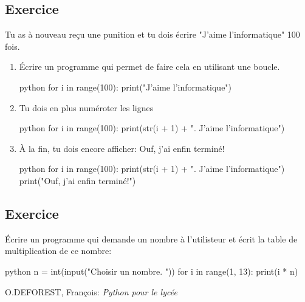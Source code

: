 \documentclass[a4paper,11pt]{article}
\begin{document}
\subsection{Exercice}
Tu as à nouveau reçu une punition et tu dois écrire "J'aime l'informatique" 100 fois.
\begin{enumerate}
\item Écrire un programme qui permet de faire cela en utilisant une boucle.
\begin{solution}
\begin{code}[interactive]{python}
for i in range(100):
    print("J'aime l'informatique")
\end{code}
\end{solution}
\item Tu dois en plus numéroter les lignes
\begin{solution}
\begin{code}[interactive]{python}
for i in range(100):
    print(str(i + 1) + ". J'aime l'informatique")
\end{code}
\end{solution}
\item À la fin, tu dois encore afficher: Ouf, j'ai enfin terminé!
\begin{solution}
\begin{code}[interactive]{python}
for i in range(100):
    print(str(i + 1) + ". J'aime l'informatique")
print("Ouf, j'ai enfin terminé!")
\end{code}
\end{solution}
\end{enumerate}

\subsection{Exercice}
Écrire un programme qui demande un nombre à l'utilisteur et écrit la table de multiplication de ce nombre:\\
\begin{solution}
\begin{code}[interactive]{python}
n = int(input("Choisir un nombre. "))
for i in range(1, 13):
  print(i * n)
\end{code}
\end{solution}

\vfill
\renewcommand{\refname}{Références}
\begin{thebibliography}{9}
 O.DEFOREST, François: \emph{Python pour le lycée}
\end{thebibliography}
\end{document}
